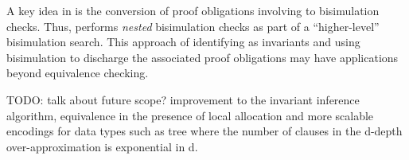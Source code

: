 A key idea in \toolName{}
is the conversion of proof
obligations involving \recursiveRelations{} to
bisimulation checks. Thus, \toolName{}
performs {\em nested}
bisimulation checks as part
of a ``higher-level''
bisimulation search. This approach of
identifying \recursiveRelations{} as invariants and using
bisimulation to discharge the associated
proof obligations may have applications
beyond equivalence checking.

TODO: talk about future scope? improvement to the invariant inference algorithm, equivalence in the presence of local allocation
and more scalable encodings for data types such as tree where the number of clauses in the d-depth over-approximation is exponential
in d.